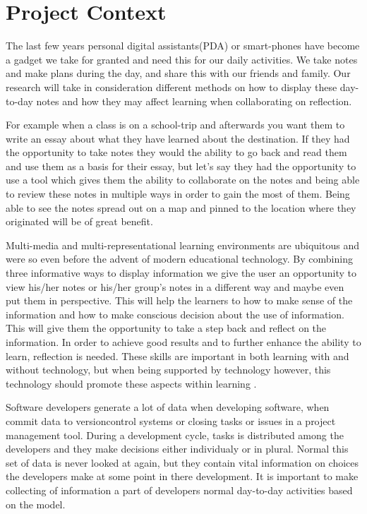 \section{Project Context}
The last few years personal digital assistants(PDA) or smart-phones have become a gadget we take for granted and need this for our daily activities.  We take notes and make plans during the day, and share this with our friends and family. Our research will take in consideration different methods on how to display these day-to-day notes and how they may affect learning when collaborating on reflection.

For example when a class is on a school-trip and afterwards you want them to write an essay about what they have learned about the destination. If they had the opportunity to take notes they would the ability to go back and read them and use them as a basis for their essay, but let’s say they had the opportunity to use a tool which gives them the ability to collaborate on the notes and being able to review these notes in multiple ways in order to gain the most of them. Being able to see the notes spread out on a map and pinned to the location where they originated will be of great benefit.

Multi-media and multi-representational learning environments are ubiquitous and were so even before the advent of modern educational technology.\cite{Ainsworth1999} By combining three informative ways to display information we give the user an opportunity to view his/her notes or his/her group’s notes in a different way and maybe even put them in perspective. This will help the learners to how to make sense of the information and how to make conscious decision about the use of information. This will give them the opportunity to take a step back and reflect on the information. In order to achieve good results and to further enhance the ability to learn, reflection is needed. These skills are important in both learning with and without technology, but when being supported by technology however, this technology should promote these aspects within learning \cite{Lin1999}.

Software developers generate a lot of data when developing software, when commit data to versioncontrol systems or closing tasks or issues in a project management tool. During a development cycle, tasks is distributed among the developers and they make decisions either individualy or in plural. Normal this set of data is never looked at again, but they contain vital information on choices the developers make at some point in there development. It is important to make collecting of information a part of developers normal day-to-day activities based on the model\cite{Krogstie2009}.


